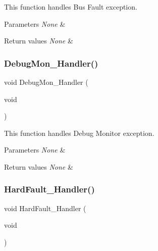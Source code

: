 This function handles Bus Fault exception. 


\begin{DoxyParams}{Parameters}
{\em None} & \\
\hline
\end{DoxyParams}

\begin{DoxyRetVals}{Return values}
{\em None} & \\
\hline
\end{DoxyRetVals}
\mbox{\label{group___template___project_gadbdfb05858cc36fc520974df37ec3cb0}} 
\subsubsection{\texorpdfstring{Debug\+Mon\+\_\+\+Handler()}{DebugMon\_Handler()}}
{\footnotesize\ttfamily void Debug\+Mon\+\_\+\+Handler (\begin{DoxyParamCaption}\item[{void}]{ }\end{DoxyParamCaption})}



This function handles Debug Monitor exception. 


\begin{DoxyParams}{Parameters}
{\em None} & \\
\hline
\end{DoxyParams}

\begin{DoxyRetVals}{Return values}
{\em None} & \\
\hline
\end{DoxyRetVals}
\mbox{\label{group___template___project_ga2bffc10d5bd4106753b7c30e86903bea}} 
\subsubsection{\texorpdfstring{Hard\+Fault\+\_\+\+Handler()}{HardFault\_Handler()}}
{\footnotesize\ttfamily void Hard\+Fault\+\_\+\+Handler (\begin{DoxyParamCaption}\item[{void}]{ }\end{DoxyParamCaption})}



